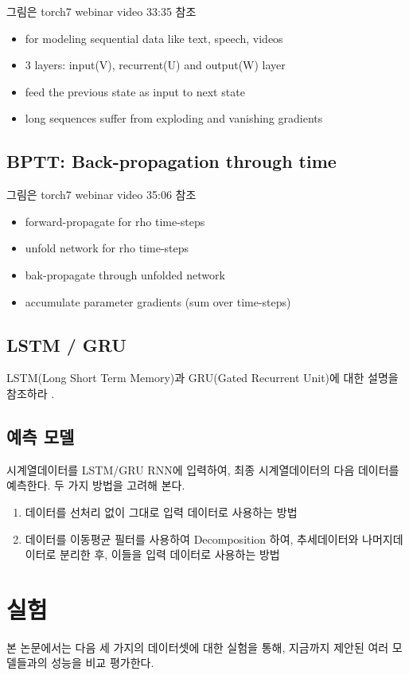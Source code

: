 \documentclass[a4paper, amsmath, 10pt, twocolumn]{oblivoir}
\begin{document}
 그림은 torch7 webinar video 33:35 참조

\begin{itemize}\tightlist
\item for modeling sequential data like text, speech, videos
\item 3 layers: input(V), recurrent(U) and output(W) layer
\item feed the previous state as input to next state
\item long sequences suffer from exploding and vanishing gradients
\end{itemize}

\subsection{BPTT: Back-propagation through time}
그림은 torch7 webinar video 35:06 참조

\begin{itemize}\tightlist
\item forward-propagate for rho time-steps
\item unfold network for rho time-steps
\item bak-propagate through unfolded network
\item accumulate parameter gradients (sum over time-steps)
\end{itemize}


\subsection{LSTM / GRU}
LSTM(Long Short Term Memory)과 GRU(Gated Recurrent Unit)에 대한 설명을 참조하라 \cite{lstmblog}.

\subsection{예측 모델}
시계열데이터를 LSTM/GRU RNN에 입력하여, 최종 시계열데이터의 다음 데이터를 예측한다. 두 가지 방법을 고려해 본다.

\begin{enumerate}
\item 데이터를 선처리 없이 그대로 입력 데이터로 사용하는 방법
\item 데이터를 이동평균 필터를 사용하여 Decomposition 하여, 추세데이터와 나머지데이터로 분리한 후, 이들을 입력 데이터로 사용하는 방법 
\end{enumerate}


\section{실험}
본 논문에서는 다음 세 가지의 데이터셋에 대한 실험을 통해, 지금까지 제안된 여러 모델들과의 성능을 비교 평가한다.
\end{document}
